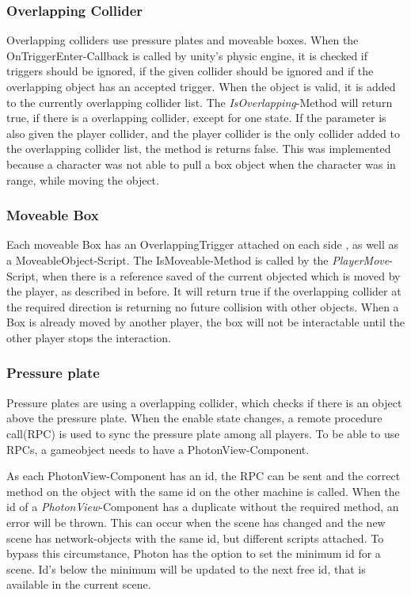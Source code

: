 \subsubsection{Overlapping Collider}

Overlapping colliders use pressure plates and moveable boxes.
When the OnTriggerEnter-Callback is called by unity's physic engine, it is checked if triggers should be ignored, if the given collider should be ignored and if the overlapping object has an accepted trigger.
When the object is valid, it is added to the currently overlapping collider list. The \textit{IsOverlapping}-Method will return true, if there is a overlapping collider, except for one state. If the parameter is also given the player collider, and the player collider is the only collider added to the overlapping collider list, the method is returns false. This was implemented because a character was not able to pull a box object when the character was in range, while moving the object.

\subsubsection{Moveable Box}

Each moveable Box has an OverlappingTrigger attached on each side , as well as a MoveableObject-Script. The IsMoveable-Method is called by the \textit{PlayerMove}-Script, when there is a reference saved of the current objected which is moved by the player, as described in before. It will return true if the overlapping collider at the required direction is returning no future collision with other objects.
When a Box is already moved by another player, the box will not be interactable until the other player stops the interaction.

\subsubsection{Pressure plate}

Pressure plates are using a overlapping collider, which checks if there is an object above the pressure plate.
When the enable state changes, a remote procedure call(RPC) is used to sync the pressure plate among all players.
To be able to use RPCs, a gameobject needs to have a PhotonView-Component.

As each PhotonView-Component has an id, the RPC can be sent and the correct method on the object with the same id on the other machine is called.
When the id of a \textit{PhotonView}-Component has a duplicate without the required method, an error will be thrown.
This can occur when the scene has changed and the new scene has network-objects with the same id, but different scripts attached. To bypass this circumstance, Photon has the option to set the minimum id for a scene. Id's below the minimum will be updated to the next free id, that is available in the current scene.

